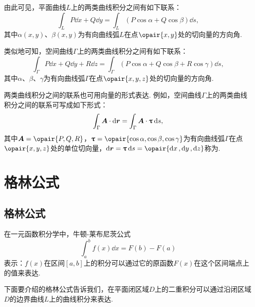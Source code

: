 由此可见，平面曲线\(L\)上的两类曲线积分之间有如下联系：
\begin{equation}\label{equation:线积分与面积分.平面曲线上两类曲线积分之间的联系}
\int_L{P\dd{x}+Q\dd{y}}
=\int_L{(P\cos\alpha+Q\cos\beta)\dd{s}},
\end{equation}
其中\(\alpha(x,y)\)、\(\beta(x,y)\)为有向曲线弧\(L\)在点\(\opair{x,y}\)处的切向量的方向角.

类似地可知，空间曲线\(\Gamma\)上的两类曲线积分之间有如下联系：
\begin{equation}\label{equation:线积分与面积分.空间曲线上两类曲线积分之间的联系}
\int_{\Gamma}{P\dd{x}+Q\dd{y}+R\dd{z}}
=\int_{\Gamma}{(P\cos\alpha+Q\cos\beta+R\cos\gamma)\dd{s}},
\end{equation}其中\(\alpha\)、\(\beta\)、\(\gamma\)为有向曲线弧\(\Gamma\)在点\(\opair{x,y,z}\)处的切向量的方向角.

两类曲线积分之间的联系也可用向量的形式表达.
例如，空间曲线\(\Gamma\)上的两类曲线积分之间的联系可写成如下形式：
\begin{equation}\label{equation:线积分与面积分.空间曲线上两类曲线积分之间的联系的向量形式}
\int_{\Gamma}{\boldsymbol{A} \cdot \dd{\boldsymbol{r}}}
= \int_{\Gamma}{\boldsymbol{A} \cdot \boldsymbol{\uptau} \dd{s}},
\end{equation}其中\(\mat{A}=\opair{P,Q,R}\)，\(\mat{\tau}=\opair{\cos\alpha,\cos\beta,\cos\gamma}\)为有向曲线弧\(\Gamma\)在点\(\opair{x,y,z}\)处的单位切向量，\(\dd{\mat{r}}=\mat{\tau}\dd{s}=\opair{\dd{x},\dd{y},\dd{z}}\)称为.

\section{格林公式}
\subsection{格林公式}
在一元函数积分学中，牛顿-莱布尼茨公式\[
\int_a^b f(x) \dd{x} = F(b) - F(a)
\]表示：\(f(x)\)在区间\([a,b]\)上的积分可以通过它的原函数\(F(x)\)在这个区间端点上的值来表达.

下面要介绍的格林公式告诉我们，在平面闭区域\(D\)上的二重积分可以通过沿闭区域\(D\)的边界曲线\(L\)上的曲线积分来表达.

